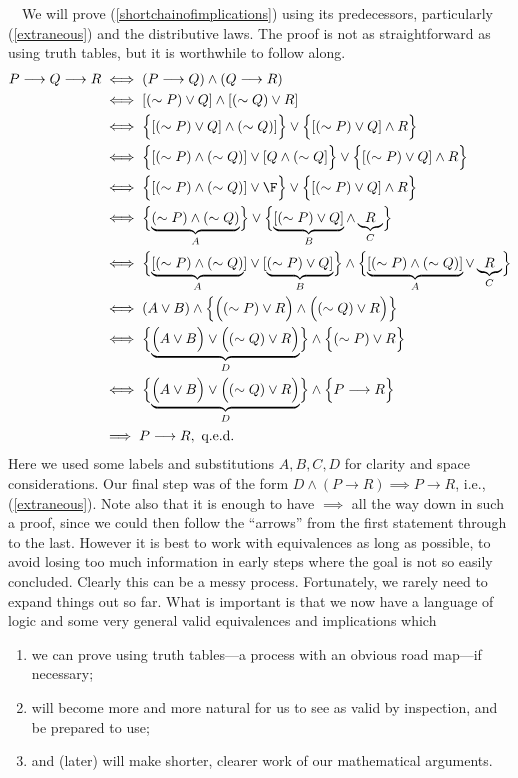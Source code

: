 \ \  We will prove (\ref{shortchainofimplications}) using
its predecessors, particularly (\ref{extraneous}) and the
distributive laws.  The proof is not as straightforward as
using truth tables, but it is worthwhile to follow along. 
\begin{align*}
P\longrightarrow Q\longrightarrow R
&\iff
(P\longrightarrow Q)\wedge(Q\longrightarrow R)\\
&\iff [(\sim P)\vee Q]\wedge[(\sim Q)\vee R]\\
&\iff \Bigl\{[(\sim P)\vee Q]\wedge(\sim Q)]\Bigr\} 
\vee \Bigl\{[(\sim P)\vee Q]\wedge R\Bigr\}\\ 
&\iff
\Bigl\{[(\sim P)\wedge(\sim Q)]\vee[Q\wedge(\sim Q]\Bigr\} 
\vee \Bigl\{[(\sim P)\vee Q]\wedge R\Bigr\}\\ 
&\iff\Bigl\{[(\sim P)\wedge(\sim Q)]\vee\F\Bigr\}
\vee \Bigl\{[(\sim P)\vee Q]\wedge R\Bigr\}
\\
&\iff\Bigl\{\underbrace{(\sim P)\wedge(\sim Q)}_{A}\Bigr\}
\vee\Bigl\{ 
\underbrace{[(\sim P)\vee Q]}_{B}\wedge \underbrace{R}_{C}\Bigr\}\\
&\iff\Bigl\{\underbrace{[(\sim P)\wedge(\sim Q)}_A]\vee[\underbrace{
(\sim P)\vee Q]}_B\Bigr\}
\wedge\Bigl\{\underbrace{[(\sim P)\wedge(\sim Q)]}_A\vee \underbrace{R}_C
\Bigr\}\\
&\iff (A\vee B)\wedge\Bigl\{\Bigl((\sim P)\vee R\Bigr)\wedge 
\Bigl((\sim Q)\vee R\Bigr)\Bigr\}\\
&\iff\Bigl\{\underbrace{\Bigl(A\vee B\Bigr)\vee\Bigl((\sim Q)\vee R\Bigr)
}_D\Bigr\}
\wedge\Bigl\{(\sim P)\vee R\Bigr\}\\
&\iff \Bigl\{\underbrace{\Bigl(A\vee B\Bigr)\vee\Bigl((\sim Q)\vee R\Bigr)
}_D\Bigr\}\wedge\Bigl\{P\longrightarrow R\Bigr\}
\\&\implies P\longrightarrow R, \text{  q.e.d.} 
\end{align*}  
Here we used some labels and substitutions
$A,B,C,D$ for clarity and  space considerations.
Our final step was of the form $D\wedge(P\longrightarrow R)
\implies P\longrightarrow R$, i.e., (\ref{extraneous}).
Note also that it is enough to have $\implies$ all the way
down in such a proof, since we could then follow the ``arrows'' 
from the first statement through to the last.
However it is best to work with equivalences as long as possible,
to avoid losing too much information in early steps where
the goal is not so easily concluded.
\eex
Clearly this can be a messy process.  Fortunately, we rarely need
to expand things out so far.  What is important is that we now
have a language of logic and some very general 
valid equivalences and implications 
which \begin{enumerate}
\item we can prove using truth tables---a
process with an obvious road map---if necessary;
\item  will become more and more 
natural for us to see as valid by inspection, and be prepared to use; 
\item and (later) will make
shorter, clearer work of our mathematical arguments. 
\end{enumerate} 


